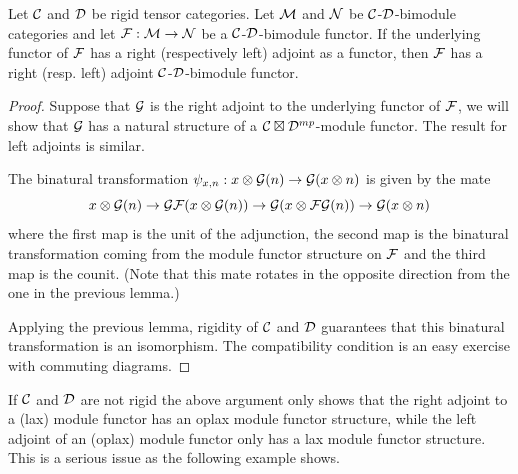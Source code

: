 \documentclass{amsart}
\begin{document}
\begin{lemma} \label{lma:module-adjoint}
Let $\mathcal C$ and $\mathcal D$ be rigid tensor categories. Let  $\mathcal M$ and  $\mathcal N$  be  $\mathcal C$-$\mathcal D$-bimodule categories and let $\mathcal F: \mathcal M \to \mathcal N$ be a $\mathcal C$-$\mathcal D$-bimodule functor.  If the underlying functor of $\mathcal F$ has a right (respectively left) adjoint as a functor, then $\mathcal F$ has a right (resp. left) adjoint $\mathcal C$-$\mathcal D$-bimodule functor. 
\end{lemma}
\begin{proof}
Suppose that $\mathcal G$ is the right adjoint to the underlying functor of $\mathcal F$, we will show that $\mathcal G$ has a natural structure of a $\mathcal C\boxtimes \mathcal D^{mp}$-module functor.  The result for left adjoints is similar.

The binatural transformation $\psi_{x,n}: x \otimes \mathcal G(n) \rightarrow \mathcal G(x \otimes n)$ is given by the mate
$$x \otimes \mathcal G(n) \rightarrow \mathcal G \mathcal F(x \otimes \mathcal G(n)) \rightarrow \mathcal G(x \otimes \mathcal F\mathcal G(n)) \rightarrow \mathcal G(x \otimes n)$$
where the first map is the unit of the adjunction, the second map is the binatural transformation coming from the module functor structure on $\mathcal F$ and the third map is the counit.  (Note that this mate rotates in the opposite direction from the one in the previous lemma.)


Applying the previous lemma, rigidity of $\mathcal C$ and $\mathcal D$ guarantees that this binatural transformation is an isomorphism.  The compatibility condition is an easy exercise with commuting diagrams.
\end{proof}

\begin{remark}
If $\mathcal C$ and $\mathcal D$ are not rigid the above argument only shows that the right adjoint to a (lax) module functor has an oplax module functor structure, while the left adjoint of an (oplax) module functor only has a lax module functor structure.  This is a serious issue as the following example shows. 
\end{remark}
\end{document}
